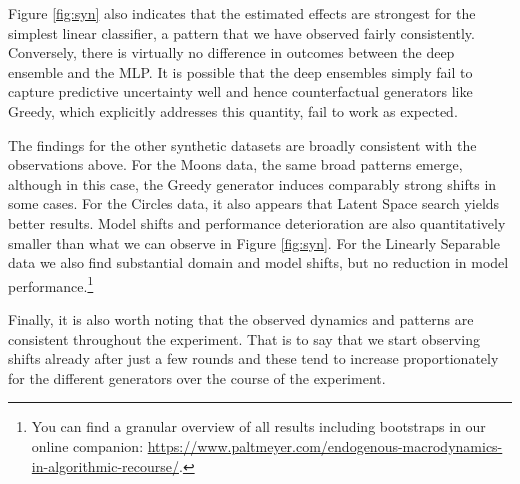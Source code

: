 \documentclass[conference,final,]{IEEEtran}
\theoremstyle{definition}
\theoremstyle{definition}
\theoremstyle{definition}
\theoremstyle{definition}
\theoremstyle{remark}
\begin{document}
Figure \ref{fig:syn} also indicates that the estimated effects are strongest for the simplest linear classifier, a pattern that we have observed fairly consistently. Conversely, there is virtually no difference in outcomes between the deep ensemble and the MLP. It is possible that the deep ensembles simply fail to capture predictive uncertainty well and hence counterfactual generators like Greedy, which explicitly addresses this quantity, fail to work as expected.

The findings for the other synthetic datasets are broadly consistent with the observations above. For the Moons data, the same broad patterns emerge, although in this case, the Greedy generator induces comparably strong shifts in some cases. For the Circles data, it also appears that Latent Space search yields better results. Model shifts and performance deterioration are also quantitatively smaller than what we can observe in Figure \ref{fig:syn}. For the Linearly Separable data we also find substantial domain and model shifts, but no reduction in model performance.\footnote{You can find a granular overview of all results including bootstraps in our online companion: \url{https://www.paltmeyer.com/endogenous-macrodynamics-in-algorithmic-recourse/}.}

Finally, it is also worth noting that the observed dynamics and patterns are consistent throughout the experiment. That is to say that we start observing shifts already after just a few rounds and these tend to increase proportionately for the different generators over the course of the experiment.
\end{document}
